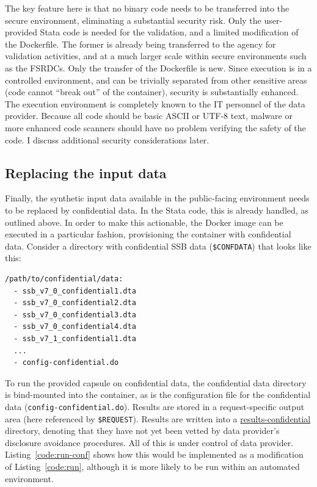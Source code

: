 \documentclass[]{hdsr}
\begin{document}
The key feature here is that no binary code needs to be transferred into the secure environment, eliminating a substantial security risk. Only the user-provided Stata code is needed for the validation, and a limited modification of the Dockerfile. The former is already being transferred to the agency for validation activities, and at a much larger scale within secure environments such as the \acp{FSRDC}. Only the transfer of the Dockerfile is new. Since execution is in a controlled environment, and can be trivially separated from other sensitive areas (code cannot ``break out'' of the container), security is substantially enhanced. The execution environment is completely known to the IT personnel of the data provider. Because all code should be basic ASCII or UTF-8 text, malware or more enhanced code scanners should have no problem verifying the safety of the code. I discuss additional security considerations later.

\subsection{Replacing the input data}

Finally, the synthetic input data available in the public-facing environment needs to be replaced by confidential data. In the Stata code, this is already handled, as outlined above. In order to make this actionable, the Docker image can be executed in a particular fashion, provisioning the container with confidential data. Consider a directory with confidential SSB data (\texttt{\$CONFDATA}) that looks like this:

\begin{lstlisting}[language=bash]
/path/to/confidential/data:
  - ssb_v7_0_confidential1.dta
  - ssb_v7_0_confidential2.dta
  - ssb_v7_0_confidential3.dta
  - ssb_v7_0_confidential4.dta
  - ssb_v7_1_confidential1.dta
  ...
  - config-confidential.do   
\end{lstlisting}

To run the provided capsule on confidential data, the confidential data directory is  bind-mounted into the container, as is the configuration file for the confidential data (\texttt{config-confidential.do}). Results are stored in a request-specific output area (here referenced by \texttt{\$REQUEST}). Results are written into a \url{results-confidential} directory, denoting that they have not yet been vetted by data provider's disclosure avoidance procedures. All of this is under control of data provider. Listing~\ref{code:run-conf} shows how this would be implemented as a  modification of Listing~\ref{code:run}, although it is more likely to be run within an automated environment. 
\end{document}
